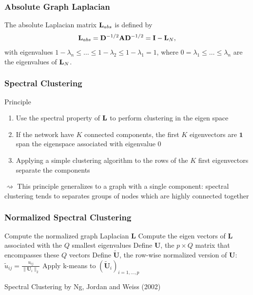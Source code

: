 \documentclass{beamer}\usepackage[]{graphicx}\usepackage[]{color}
\begin{document}
\begin{frame}
  \frametitle{Absolute Graph Laplacian}

  \begin{definition}
    The absolute Laplacian matrix $\mathbf{L}_{abs}$ is defined by 
    \[
      \mathbf{L}_{abs} = \mathbf{D}^{-1/2}\mathbf{A}\mathbf{D}^{-1/2} = \mathbf{I} - \mathbf{L}_N,
    \]
    with eigenvalues $1-\lambda_n \leq \dots \leq 1-\lambda_2 \leq 1-\lambda_1 = 1$, where $0=\lambda_1\leq \dots \leq \lambda_n$ are the eigenvalues of $\mathbf{L}_N$.
  \end{definition}

\end{frame}

\begin{frame}
  \frametitle{Spectral Clustering}
    
  \begin{block}{Principle}
  
  \begin{enumerate}
    \item Use the spectral property of $\mathbf{L}$ to perform clustering in the eigen space \medskip
    \item If the network have $K$ connected components, the first $K$ eigenvectors are $\mathbf{1}$ span the eigenspace associated with eigenvalue $0$ \medskip
    \item Applying a simple clustering algorithm to the rows of the $K$ first eigenvectors separate the components
  \end{enumerate}
  $\rightsquigarrow$ This principle generalizes to a graph with a single component: spectral clustering tends to separates groups of nodes which are highly connected together
  
  \end{block}
  
\end{frame}

\begin{frame}
  \frametitle{Normalized Spectral Clustering}

\begin{algorithm}[H]
  \BlankLine\BlankLine
  \DontPrintSemicolon
  
  Compute the normalized graph Laplacian $\mathbf{L}$\;
  Compute the eigen vectors of $\mathbf{L}$ associated with the $Q$ \alert{smallest eigenvalues}\;
  Define $\mathbf{U}$,  the $p\times Q$ matrix  that encompasses these $Q$ vectors \;
  Define $\tilde{\mathbf{U}}$, the row-wise normalized version of $\mathbf{U}$: $ \tilde{u}_{ij} = \frac{u_{ij}}{\| \mathbf{U}_i\|_2}$\;
  Apply k-means to $(\tilde{\mathbf{U}}_i)_{i=1,\dots,p}$

  \BlankLine\BlankLine

  \caption{Spectral Clustering by Ng, Jordan and Weiss (2002)}
\end{algorithm}

\end{frame}
\end{document}
